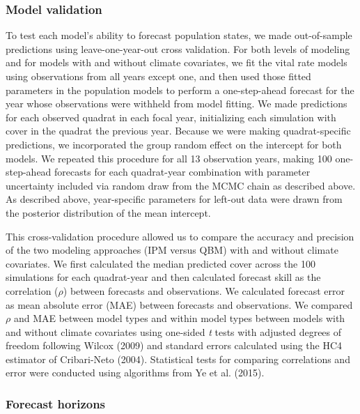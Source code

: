 \documentclass[12pt,]{article}
\begin{document}
\subsubsection{Model validation}\label{model-validation}

To test each model's ability to forecast population states, we made
out-of-sample predictions using leave-one-year-out cross validation. For
both levels of modeling and for models with and without climate
covariates, we fit the vital rate models using observations from all
years except one, and then used those fitted parameters in the
population models to perform a one-step-ahead forecast for the year
whose observations were withheld from model fitting. We made predictions
for each observed quadrat in each focal year, initializing each
simulation with cover in the quadrat the previous year. Because we were
making quadrat-specific predictions, we incorporated the group random
effect on the intercept for both models. We repeated this procedure for
all 13 observation years, making 100 one-step-ahead forecasts for each
quadrat-year combination with parameter uncertainty included via random
draw from the MCMC chain as described above. As described above,
year-specific parameters for left-out data were drawn from the posterior
distribution of the mean intercept.

This cross-validation procedure allowed us to compare the accuracy and
precision of the two modeling approaches (IPM versus QBM) with and
without climate covariates. We first calculated the median predicted
cover across the 100 simulations for each quadrat-year and then
calculated forecast skill as the correlation (\(\rho\)) between
forecasts and observations. We calculated forecast error as mean
absolute error (MAE) between forecasts and observations. We compared
\(\rho\) and MAE between model types and within model types between
models with and without climate covariates using one-sided \emph{t}
tests with adjusted degrees of freedom following Wilcox (2009) and
standard errors calculated using the HC4 estimator of Cribari-Neto
(2004). Statistical tests for comparing correlations and error were
conducted using algorithms from Ye et al. (2015).

\subsubsection{Forecast horizons}\label{forecast-horizons}
\end{document}
